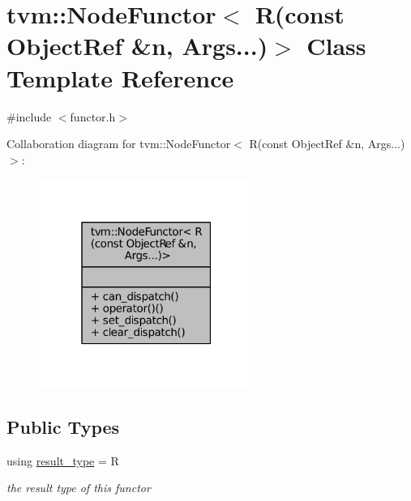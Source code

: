 \hypertarget{classtvm_1_1NodeFunctor_3_01R_07const_01ObjectRef_01_6n_00_01Args_8_8_8_08_4}{}\section{tvm\+:\+:Node\+Functor$<$ R(const Object\+Ref \&n, Args...)$>$ Class Template Reference}
\label{classtvm_1_1NodeFunctor_3_01R_07const_01ObjectRef_01_6n_00_01Args_8_8_8_08_4}


{\ttfamily \#include $<$functor.\+h$>$}



Collaboration diagram for tvm\+:\+:Node\+Functor$<$ R(const Object\+Ref \&n, Args...)$>$\+:
\nopagebreak
\begin{figure}[H]
\begin{center}
\leavevmode
\includegraphics[width=199pt]{classtvm_1_1NodeFunctor_3_01R_07const_01ObjectRef_01_6n_00_01Args_8_8_8_08_4__coll__graph}
\end{center}
\end{figure}
\subsection*{Public Types}
\begin{DoxyCompactItemize}
\item 
using \hyperlink{classtvm_1_1NodeFunctor_3_01R_07const_01ObjectRef_01_6n_00_01Args_8_8_8_08_4_ac7f687cb7dda02407b578a6683fa708a}{result\+\_\+type} = R
\begin{DoxyCompactList}\small\item\em the result type of this functor \end{DoxyCompactList}\end{DoxyCompactItemize}
